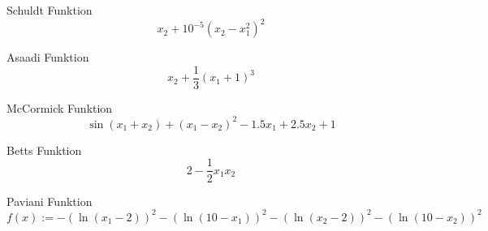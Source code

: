
\begin{testfunction}
Schuldt Funktion
\[
x_2+10^{-5}(x_2-x_1^2)^2
\]
\end{testfunction}

\begin{testfunction}
Asaadi Funktion
\[
x_2+\frac{1}{3}(x_1+1)^3
\]
\end{testfunction}

\begin{testfunction}
McCormick Funktion
\[
\sin(x_1+x_2) + (x_1-x_2)^2 - 1.5x_1 + 2.5x_2 + 1
\]
\end{testfunction}

\begin{testfunction}
Betts Funktion
\[
2 - \frac{1}{2}x_1x_2
\]
\end{testfunction}

\begin{testfunction}
Paviani Funktion
\[
  f(x) := - (\ln(x_1-2))^2 - (\ln(10-x_1))^2
            - (\ln(x_2-2))^2 - (\ln(10-x_2))^2
\]
\end{testfunction}
